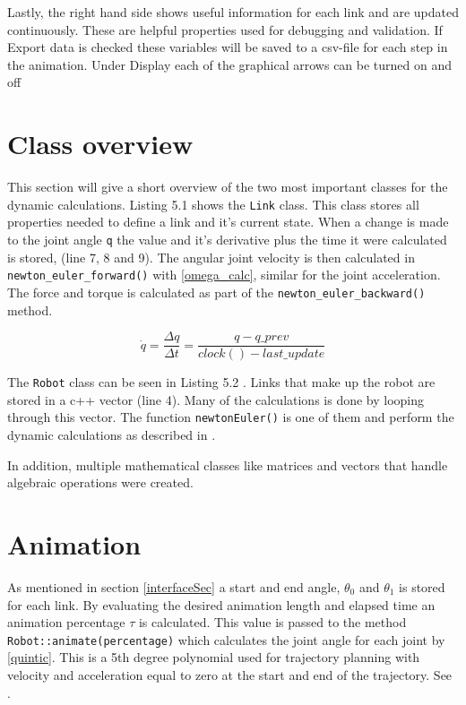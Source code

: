 Lastly, the right hand side shows useful information for each link and are updated continuously. These are helpful properties used for debugging and validation. If \textsf{Export data} is checked these variables will be saved to a csv-file for each step in the animation. Under \textsf{Display} each of the graphical arrows can be turned on and off

\section{Class overview}

This section will give a short overview of the two most important classes for the dynamic calculations. Listing 5.1  shows the \texttt{Link} class. This class stores all properties needed to define a link and it's current state. When a change is made to the joint angle \texttt{q} the value and it's derivative plus the time it were calculated is stored, (line 7, 8 and 9). The angular joint velocity is then calculated in \texttt{newton\_euler\_forward()} with \eqref{omega_calc}, similar for the joint acceleration. The force and torque is calculated as part of the \texttt{newton\_euler\_backward()} method.


\label{Link}

\begin{equation}\label{omega_calc}
\dot{q} = \frac{\Delta q}{\Delta t}=\frac{q-q\_prev}{clock()-last\_update}
\end{equation}

\label{Robot}

The \texttt{Robot} class can be seen in Listing 5.2 . Links that make up the robot are stored in a c++ vector (line 4). Many of the calculations is done by looping through this vector. The function \texttt{newtonEuler()} is one of them and perform the dynamic calculations as described in .

In addition, multiple mathematical classes like matrices and vectors that handle algebraic operations were created.

\section{Animation}

As mentioned in section \ref{interfaceSec} a start and end angle, $\theta_0$ and $\theta_1$ is stored for each link. By evaluating the desired animation length and elapsed time an animation percentage $\tau$ is calculated. This value is passed to the method \texttt{Robot::animate(percentage)} which calculates the joint angle for each joint by \eqref{quintic}. This is a 5th degree polynomial used for trajectory planning with velocity and acceleration equal to zero at the start and end of the trajectory. See .

